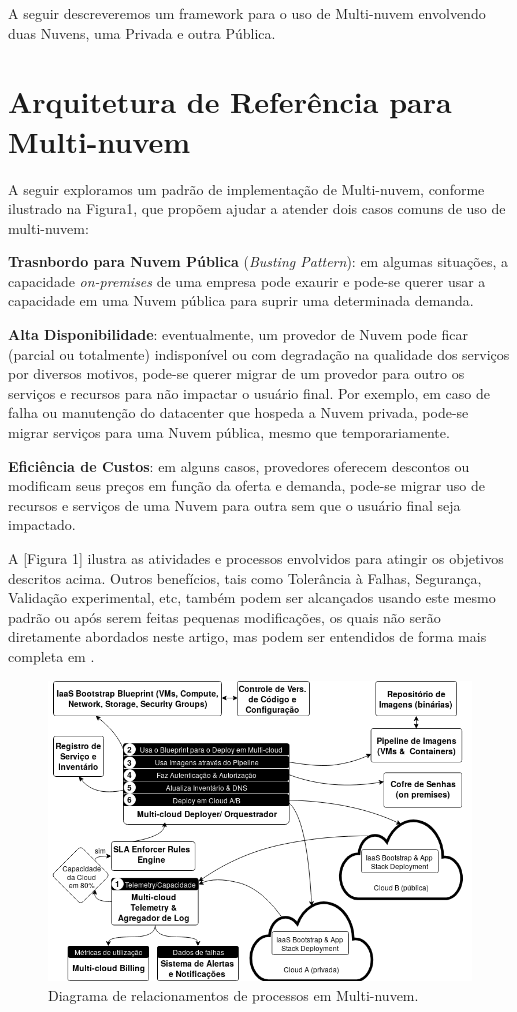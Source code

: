 \documentclass[12pt]{article}
\begin{document}
	A seguir descreveremos um framework para o uso de Multi-nuvem envolvendo duas Nuvens, uma Privada e outra Pública. 
	
	
	
	\section{Arquitetura de Referência para Multi-nuvem}
	
	A seguir exploramos um padrão de implementação de Multi-nuvem, conforme ilustrado na Figura1, que propõem ajudar a atender dois casos comuns de uso de multi-nuvem:
	
	\textbf{Trasnbordo para Nuvem Pública} (\textit{Busting Pattern}): em algumas situações, a capacidade \textit{on-premises} de uma empresa pode exaurir e pode-se querer usar a capacidade em uma Nuvem pública para suprir uma determinada demanda.
	
	\textbf{Alta Disponibilidade}: eventualmente, um provedor de Nuvem pode ficar (parcial ou totalmente) indisponível ou com degradação na qualidade dos serviços por diversos motivos, pode-se querer migrar de um provedor para outro os serviços e recursos para não impactar o usuário final. Por exemplo, em caso de falha ou manutenção do datacenter que hospeda a Nuvem privada, pode-se migrar serviços para uma Nuvem pública, mesmo que temporariamente.
	   
	\textbf{Eficiência de Custos}: em alguns casos, provedores oferecem descontos ou modificam seus preços em função da oferta e demanda, pode-se migrar uso de recursos e serviços de uma Nuvem para outra sem que o usuário final seja impactado.
	
	A [Figura 1] ilustra as atividades e processos envolvidos para atingir os objetivos descritos acima. Outros benefícios, tais como Tolerância à Falhas, Segurança, Validação experimental, etc, também podem ser alcançados usando este mesmo padrão ou após serem feitas pequenas modificações, os quais não serão diretamente abordados neste artigo, mas podem ser entendidos de forma mais completa em \cite{Fisher:2018}.
		
	\begin{figure}[H]
		\centering
		\includegraphics[width=0.9\linewidth]{figuras/Figure1.png}
		\caption{Diagrama de relacionamentos de processos em Multi-nuvem.}
		\label{fig:figure1}
	\end{figure}
	
\end{document}
